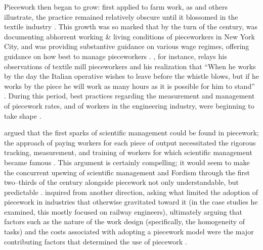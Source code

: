 \documentclass[trackingWork]{subfiles}
\begin{document}
Piecework then began to grow: first applied to farm work, as
\citeauthor{hughRaynbirdTaskWork} and others illustrate,
the practice remained relatively obscure until
it blossomed in the textile industry
\cite{hughRaynbirdTaskWork}.
This growth was so marked that by the turn of the  century,
\citeauthor{riisOtherSideLives} was documenting abhorrent working \& living conditions of pieceworkers in New York City,
and \citeauthor{norton1900textile} was providing substantive guidance on various wage regimes,
offering guidance on how best to manage pieceworkers
\cite{riisOtherSideLives,norton1900textile}.
\citeauthor{clark1908cotton}, for instance,
relays his observations of textile mill pieceworkers and his realization that
``When he works by the day the Italian operative wishes to leave before the whistle blows,
but if he works by the piece he will work as many hours as it is possible for him to stand''
\cite{clark1908cotton}.
During this period, best practices regarding the measurement and management of
piecework rates, and of workers in the engineering industry,
were beginning to take shape
\cite{burton1899commercial}.

\citeauthor{10.2307/23702539} argued that the first sparks of scientific management
could be found in piecework;
the approach of paying workers for each piece of output necessitated
the rigorous tracking, measurement, and training of workers
for which scientific management became famous
\cite{10.2307/23702539}.
This argument is certainly compelling;
it would seem to make the concurrent upswing of
scientific management and Fordism
through the first two--thirds of the  century
alongside piecework not only understandable, but predictable
\cite{hart2013rise}.
\citeauthor{Brown01041990} inquired from another direction, asking
what limited the adoption of piecework in industries that otherwise gravitated toward it
(in the case studies he examined, this mostly focused on railway engineers),
ultimately arguing that factors such as the nature of the work design
(specifically, the homogeneity of tasks) and the costs associated with adopting a piecework model
were the major contributing factors that determined the use of piecework
\cite{Brown01041990}.
\end{document}
